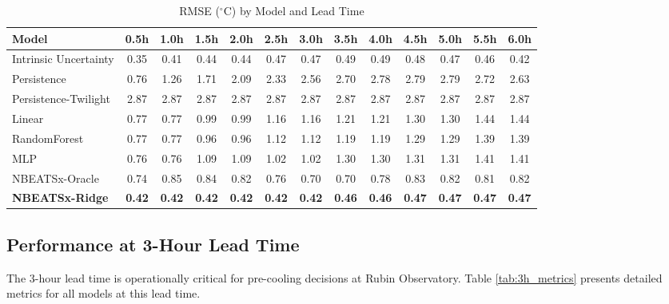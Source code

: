 \documentclass[11pt]{article}
\begin{document}
\begin{table}[H]
\centering
\caption{RMSE ($^\circ$C) by Model and Lead Time}
\label{tab:rmse}
\small
\begin{tabular}{lcccccccccccc}
\toprule
Model & 0.5h & 1.0h & 1.5h & 2.0h & 2.5h & 3.0h & 3.5h & 4.0h & 4.5h & 5.0h & 5.5h & 6.0h \\
\midrule
Intrinsic Uncertainty & 0.35 & 0.41 & 0.44 & 0.44 & 0.47 & 0.47 & 0.49 & 0.49 & 0.48 & 0.47 & 0.46 & 0.42 \\
\midrule
Persistence & 0.76 & 1.26 & 1.71 & 2.09 & 2.33 & 2.56 & 2.70 & 2.78 & 2.79 & 2.79 & 2.72 & 2.63 \\
Persistence-Twilight & 2.87 & 2.87 & 2.87 & 2.87 & 2.87 & 2.87 & 2.87 & 2.87 & 2.87 & 2.87 & 2.87 & 2.87 \\
Linear & 0.77 & 0.77 & 0.99 & 0.99 & 1.16 & 1.16 & 1.21 & 1.21 & 1.30 & 1.30 & 1.44 & 1.44 \\
RandomForest & 0.77 & 0.77 & 0.96 & 0.96 & 1.12 & 1.12 & 1.19 & 1.19 & 1.29 & 1.29 & 1.39 & 1.39 \\
MLP & 0.76 & 0.76 & 1.09 & 1.09 & 1.02 & 1.02 & 1.30 & 1.30 & 1.31 & 1.31 & 1.41 & 1.41 \\
NBEATSx-Oracle & 0.74 & 0.85 & 0.84 & 0.82 & 0.76 & 0.70 & 0.70 & 0.78 & 0.83 & 0.82 & 0.81 & 0.82 \\
\midrule
\textbf{NBEATSx-Ridge} & \textbf{0.42} & \textbf{0.42} & \textbf{0.42} & \textbf{0.42} & \textbf{0.42} & \textbf{0.42} & \textbf{0.46} & \textbf{0.46} & \textbf{0.47} & \textbf{0.47} & \textbf{0.47} & \textbf{0.47} \\
\bottomrule
\end{tabular}
\end{table}

\subsection{Performance at 3-Hour Lead Time}
The 3-hour lead time is operationally critical for pre-cooling decisions at Rubin Observatory. Table \ref{tab:3h_metrics} presents detailed metrics for all models at this lead time.
\end{document}
